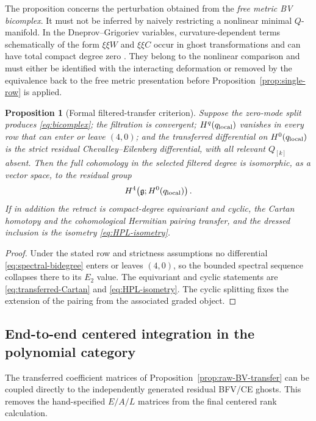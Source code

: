 \documentclass[11pt]{article}
\newtheorem{proposition}[theorem]{Proposition}
\theoremstyle{definition}
\theoremstyle{remark}
\newcommand{\g}{\mathfrak g}
\begin{document}
The proposition concerns the perturbation obtained from the \emph{free
metric BV bicomplex}.  It must not be inferred by naively restricting a
nonlinear minimal $Q$-manifold.  In the Dneprov--Grigoriev variables,
curvature-dependent terms schematically of the form $\xi\xi W$ and
$\xi\xi C$ occur in ghost transformations and can have total compact degree
zero \cite{DneprovGrigoriev}.  They belong to the nonlinear comparison and
must either be identified with the interacting deformation or removed by
the equivalence back to the free metric presentation before
Proposition~\ref{prop:single-row} is applied.

\begin{proposition}[Formal filtered-transfer criterion]\label{prop:formal-transfer}
Suppose the zero-mode split produces \eqref{eq:bicomplex}; the filtration is
convergent; $H^q(q_{\rm local})$ vanishes in every row that can enter or
leave $(4,0)$; and the transferred differential on $H^0(q_{\rm local})$ is
the strict residual Chevalley--Eilenberg differential, with all relevant
$Q_{[k]}$ absent.  Then the full cohomology in the selected filtered degree
is isomorphic, as a vector space, to the residual group
\begin{equation}
 H^4\!\left(\g;H^0(q_{\rm local})\right).
\end{equation}
If in addition the retract is compact-degree equivariant and cyclic, the
Cartan homotopy and the cohomological Hermitian pairing transfer, and the
dressed inclusion is the isometry \eqref{eq:HPL-isometry}.
\end{proposition}

\begin{proof}
Under the stated row and strictness assumptions no differential
\eqref{eq:spectral-bidegree} enters or leaves $(4,0)$, so the bounded
spectral sequence collapses there to its $E_2$ value.  The equivariant and
cyclic statements are \eqref{eq:transferred-Cartan} and
\eqref{eq:HPL-isometry}.  The cyclic splitting fixes the extension of the
pairing from the associated graded object.
\end{proof}

\subsection{End-to-end centered integration in the polynomial category}

The transferred coefficient matrices of
Proposition~\ref{prop:raw-BV-transfer} can be coupled directly to the
independently generated residual BFV/CE ghosts.  This removes the
hand-specified $E/A/L$ matrices from the final centered rank calculation.
\end{document}
